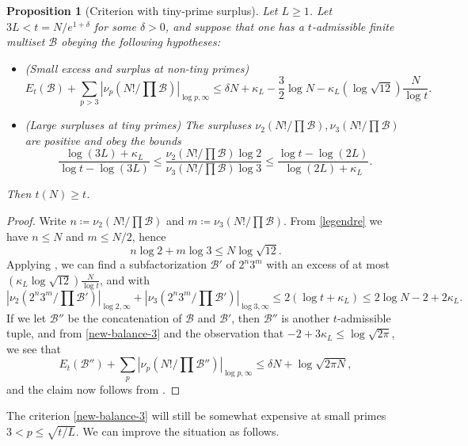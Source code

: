 \documentclass[12pt,a4paper,reqno]{amsart}
\numberwithin{equation}{section}
\theoremstyle{plain}
\newtheorem{proposition}[theorem]{Proposition}
\theoremstyle{definition}
\newcommand\tuple{{\mathcal B}}
\begin{document}
\begin{proposition}[Criterion with tiny-prime surplus]\label{balance-23}  Let $L \geq 1$.
  Let $3L < t = N/e^{1+\delta}$ for some $\delta>0$, and suppose that one has a $t$-admissible finite multiset $\tuple$ obeying the following hypotheses:
\begin{itemize}
  \item[(i)] (Small excess and surplus at non-tiny primes)
  \begin{equation}\label{new-balance-3}
    E_t(\tuple) + \sum_{p>3} |\nu_p(N!/\prod \tuple)|_{\log p,\infty} \leq \delta N + \kappa_L - \frac{3}{2} \log N - \kappa_L (\log \sqrt{12}) \frac{N}{\log t}.
  \end{equation}
  \item[(ii)] (Large surpluses at tiny primes)
The surpluses $\nu_2(N!/\prod \tuple), \nu_3(N!/\prod \tuple)$ are positive and obey the bounds
$$
\frac{\log(3L)+\kappa_L}{\log t - \log(3L)} \leq \frac{\nu_2(N!/\prod \tuple) \log 2}{\nu_3(N!/\prod \tuple) \log 3} \leq \frac{\log t - \log(2L)}{\log(2L)+\kappa_L}.
$$
\end{itemize}
Then $t(N) \geq t$.
\end{proposition}
  

\begin{proof} Write $n \coloneqq \nu_2(N!/\prod \tuple)$ and $m \coloneqq \nu_3(N!/\prod \tuple)$.  From \eqref{legendre} we have $n \leq N$ and $m \leq N/2$, hence
  $$ n \log 2 + m \log 3 \leq N \log \sqrt{12}.$$
Applying , we can find a subfactorization $\tuple'$ of $2^n 3^m$ with an excess of at most $(\kappa_L \log \sqrt{12}) \frac{N}{\log t}$, and with
$$ |\nu_2(2^n 3^m/\prod \tuple')|_{\log 2,\infty}
+ |\nu_3(2^n 3^m/\prod \tuple')|_{\log 3,\infty}
 \leq 2(\log t + \kappa_L) \leq 2 \log N - 2 + 2 \kappa_L.$$
 If we let $\tuple''$ be the concatenation of $\tuple$ and $\tuple'$, then $\tuple''$ is another $t$-admissible tuple, and from \eqref{new-balance-3} and the observation that $-2+3\kappa_L \leq \log \sqrt{2\pi}$, we see that
 $$
 E_t(\tuple'') + \sum_{p} |\nu_p(N!/\prod \tuple'')|_{\log p,\infty} \leq \delta N + \log \sqrt{2\pi N},$$
 and the claim now follows from .
\end{proof}

The criterion \eqref{new-balance-3} will still be somewhat expensive at small primes $3 < p \leq \sqrt{t/L}$.  We can improve the situation as follows.
\end{document}
